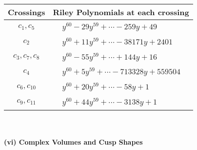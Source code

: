 \documentclass[1p]{elsarticle_modified}
\theoremstyle{definition}
\begin{document}
\begin{tabular}{m{50pt}|m{274pt}}
Crossings & \hspace{64pt}Riley Polynomials at each crossing \\
\hline $$\begin{aligned}c_{1},c_{5}\end{aligned}$$&$\begin{aligned}
&y^{60}-29 y^{59}+\cdots-259 y+49
\end{aligned}$\\
\hline $$\begin{aligned}c_{2}\end{aligned}$$&$\begin{aligned}
&y^{60}+11 y^{59}+\cdots-38171 y+2401
\end{aligned}$\\
\hline $$\begin{aligned}c_{3},c_{7},c_{8}\end{aligned}$$&$\begin{aligned}
&y^{60}-55 y^{59}+\cdots+144 y+16
\end{aligned}$\\
\hline $$\begin{aligned}c_{4}\end{aligned}$$&$\begin{aligned}
&y^{60}+5 y^{59}+\cdots-713328 y+559504
\end{aligned}$\\
\hline $$\begin{aligned}c_{6},c_{10}\end{aligned}$$&$\begin{aligned}
&y^{60}+20 y^{59}+\cdots-58 y+1
\end{aligned}$\\
\hline $$\begin{aligned}c_{9},c_{11}\end{aligned}$$&$\begin{aligned}
&y^{60}+44 y^{59}+\cdots-3138 y+1
\end{aligned}$\\
\hline
\end{tabular}\\~\\
\newpage\flushleft \textbf{(vi) Complex Volumes and Cusp Shapes}
\end{document}
